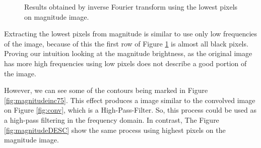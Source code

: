 \documentclass[12pt,a4paper]{article}
\begin{document}
\begin{figure}[!h]
{{		}
		\label{fig:magnitudeinc50}
	}
	\quad
	
	\caption{Results obtained by inverse Fourier transform using the lowest pixels on magnitude image.}
	\label{fig:magnitudeINC}
\end{figure}
	
Extracting the lowest pixels from magnitude is similar to use only low frequencies of the image, because of this the first row of Figure \ref{fig:magnitudeINC} is almost all black pixels. Proving our intuition looking at the magnitude brightness, as the original image has more high frequencies using low pixels does not describe a good portion of the image. \\

\newpage

However, we can see some of the contours being marked in Figure \ref{fig:magnitudeinc75}. This effect produces a image similar to the convolved image on Figure \ref{fig:conv}, which is a High-Pass-Filter. So, this process could be used as a high-pass filtering in the frequency domain. In contrast, The Figure \ref{fig:magnitudeDESC} show the same process using highest pixels on the magnitude image. \\
\end{document}
